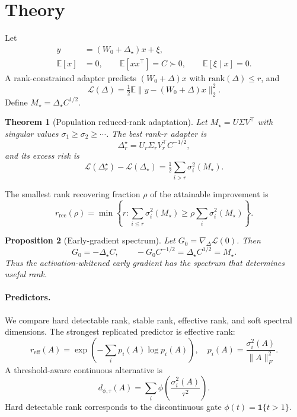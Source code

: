 \documentclass[10pt,twocolumn]{article}
\newtheorem{theorem}{Theorem}[section]
\newtheorem{proposition}[theorem]{Proposition}
\theoremstyle{definition}
\newcommand{\E}{\mathbb{E}}
\newcommand{\rank}{\mathrm{rank}}
\newcommand{\half}{\tfrac12}
\newcommand{\DeltaStar}{\Delta_\star}
\newcommand{\Mstar}{M_\star}
\newcommand{\eff}{\mathrm{eff}}
\newcommand{\rec}{\mathrm{rec}}
\begin{document}
\section{Theory}
\label{sec:theory}

Let
\begin{align}
    y&=(W_0+\DeltaStar)x+\xi,\\
    \E[x]&=0,\qquad \E[xx^\top]=C\succ0,\qquad \E[\xi\mid x]=0.
\end{align}
A rank-constrained adapter predicts $(W_0+\Delta)x$ with $\rank(\Delta)\le r$, and
\begin{equation}
    \mathcal L(\Delta)=\half\E\|y-(W_0+\Delta)x\|_2^2.
\end{equation}
Define $\Mstar=\DeltaStar C^{1/2}$.

\begin{theorem}[Population reduced-rank adaptation]
\label{thm:population}
Let $\Mstar=U\Sigma V^\top$ with singular values $\sigma_1\ge\sigma_2\ge\cdots$.  The best rank-$r$ adapter is
\begin{equation}
    \Delta_r^\star=U_r\Sigma_rV_r^\top C^{-1/2},
\end{equation}
and its excess risk is
\begin{equation}
    \mathcal L(\Delta_r^\star)-\mathcal L(\DeltaStar)=\half\sum_{i>r}\sigma_i^2(\Mstar).
\end{equation}
\end{theorem}

The smallest rank recovering fraction $\rho$ of the attainable improvement is
\begin{equation}
    r_{\rec}(\rho)=\min\left\{r:\sum_{i\le r}\sigma_i^2(\Mstar)\ge \rho\sum_i\sigma_i^2(\Mstar)\right\}.
\end{equation}

\begin{proposition}[Early-gradient spectrum]
\label{prop:early-gradient}
Let $G_0=\nabla_\Delta\mathcal L(0)$.  Then
\begin{equation}
    G_0=-\DeltaStar C,\qquad -G_0C^{-1/2}=\DeltaStar C^{1/2}=\Mstar.
\end{equation}
Thus the activation-whitened early gradient has the spectrum that determines useful rank.
\end{proposition}

\paragraph{Predictors.}
We compare hard detectable rank, stable rank, effective rank, and soft spectral dimensions.  The strongest replicated predictor is effective rank:
\begin{equation}
    r_{\eff}(A)=\exp\left(-\sum_i p_i(A)\log p_i(A)\right),\quad p_i(A)=\frac{\sigma_i^2(A)}{\|A\|_F^2}.
\end{equation}
A threshold-aware continuous alternative is
\begin{equation}
    d_{\phi,\tau}(A)=\sum_i\phi\left(\frac{\sigma_i^2(A)}{\tau^2}\right).
\end{equation}
Hard detectable rank corresponds to the discontinuous gate $\phi(t)=\mathbf 1\{t>1\}$.
\end{document}

